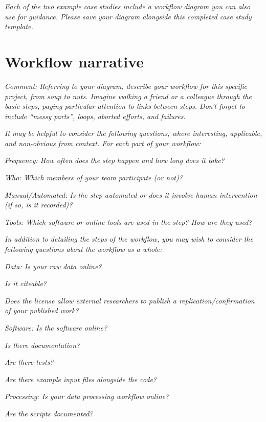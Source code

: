 \documentclass[
  11pt
]{article}
\begin{document}
\noindent
\textit{Each of the two example case studies include a workflow diagram you can also use for guidance. Please save your diagram alongside this completed case study template.}



\section{Workflow narrative}

\textit{Comment: Referring to your diagram, describe your workflow for this specific project, from soup to nuts. Imagine walking a friend or a colleague through the basic steps, paying particular attention to links between steps. Don't forget to include ``messy parts'', loops, aborted efforts, and failures.}

\noindent
\textit{It may be helpful to consider the following questions, where interesting, applicable, and non-obvious from context. For each part of your workflow:}

\noindent
\textit{Frequency: How often does the step happen and how long does it take?}

\noindent
\textit{Who: Which members of your team participate (or not)?}

\noindent
\textit{Manual/Automated: Is the step automated or does it involve human intervention (if so, is it recorded)?}

\noindent
\textit{Tools: Which software or online tools are used in the step? How are they used?}

\noindent
\textit{In addition to detailing the steps of the workflow, you may wish to consider the following questions about the workflow as a whole:}

\noindent
\textit{Data: Is your raw data online?}

\textit{Is it citeable?}

\textit{Does the license allow external researchers to publish a replication/confirmation of your published work?}

\noindent
\textit{Software: Is the software online?}

\textit{Is there documentation?}

\textit{Are there tests?}

\textit{Are there example input files alongside the code?}

\noindent
\textit{Processing: Is your data processing workflow online?}

\textit{Are the scripts documented?}
\end{document}
